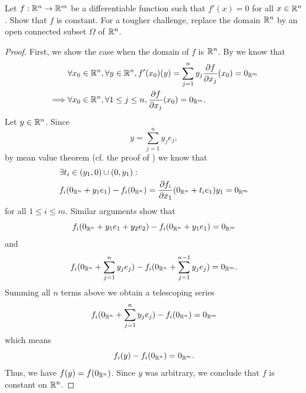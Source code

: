 \begin{ex}\label{ii:ex:6.3.4}
  Let \(f : \mathbb{R}^n \to \mathbb{R}^m\) be a differentiable function such that \(f'(x) = 0\) for all \(x \in \mathbb{R}^n\).
  Show that \(f\) is constant.
  For a tougher challenge, replace the domain \(\mathbb{R}^n\) by an open connected subset \(\Omega\) of \(\mathbb{R}^n\).
\end{ex}

\begin{proof}
  First, we show the case when the domain of \(f\) is \(\mathbb{R}^n\).
  By  we know that
  \begin{align*}
             & \forall x_0 \in \mathbb{R}^n, \forall y \in \mathbb{R}^n, f'(x_0)(y) = \sum_{j = 1}^n y_j \dfrac{\partial f}{\partial x_j}(x_0) = 0_{\mathbb{R}^m} \\
    \implies & \forall x_0 \in \mathbb{R}^n, \forall 1 \leq j \leq n, \dfrac{\partial f}{\partial x_j}(x_0) = 0_{\mathbb{R}^m}.
  \end{align*}
  Let \(y \in \mathbb{R}^n\).
  Since
  \[
    y = \sum_{j = 1}^n y_j e_j,
  \]
  by mean value theorem (cf. the proof of ) we know that
  \begin{align*}
     & \exists t_i \in (y_1, 0) \cup (0, y_1) :                                                                        \\
     & f_i(0_{\mathbb{R}^n} + y_1 e_1) - f_i(0_{\mathbb{R}^n}) = \dfrac{\partial f_i}{\partial x_1}(0_{\mathbb{R}^n} + t_i e_1) y_1 = 0_{\mathbb{R}^m}
  \end{align*}
  for all \(1 \leq i \leq m\).
  Similar arguments show that
  \[
    f_i(0_{\mathbb{R}^n} + y_1 e_1 + y_2 e_2) - f_i(0_{\mathbb{R}^n} + y_1 e_1) = 0_{\mathbb{R}^m}
  \]
  and
  \[
    f_i(0_{\mathbb{R}^n} + \sum_{j = 1}^n y_j e_j) - f_i(0_{\mathbb{R}^n} + \sum_{j = 1}^{n - 1} y_j e_j) = 0_{\mathbb{R}^m}.
  \]
  Summing all \(n\) terms above we obtain a telescoping series
  \[
    f_i(0_{\mathbb{R}^n} + \sum_{j = 1}^n y_j e_j) - f_i(0_{\mathbb{R}^n}) = 0_{\mathbb{R}^m}
  \]
  which means
  \[
    f_i(y) - f_i(0_{\mathbb{R}^n}) = 0_{\mathbb{R}^m}.
  \]
  Thus, we have \(f(y) = f(0_{\mathbb{R}^n})\).
  Since \(y\) was arbitrary, we conclude that \(f\) is constant on \(\mathbb{R}^n\).


\end{proof}
